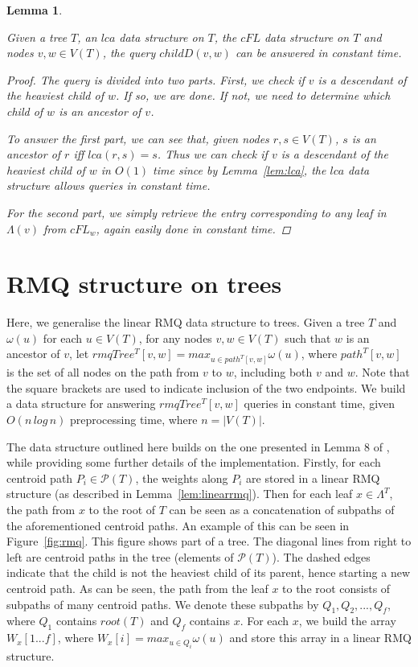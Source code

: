 \documentclass{article}
\newcommand{\leafset}{\Lambda}
\newcommand{\weight}{\omega}
\newtheorem{cfdquery}[incompatibility]{Lemma}
\begin{document}
    \medskip
    \begin{cfdquery}
        \label{lem:cfdquery}

        Given a tree $T$, an $lca$ data structure on $T$, the $cFL$ data structure on $T$ and nodes $v, w \in V(T)$, the query $childD(v, w)$ can be answered in constant time.

        \begin{proof}
            The query is divided into two parts. First, we check if $v$ is a descendant of the heaviest child of $w$. If so, we are done. If not, we need to determine which child of $w$ is an ancestor of $v$.

            To answer the first part, we can see that, given nodes $r, s \in V(T)$, $s$ is an ancestor of $r$ iff $lca(r, s) = s$. Thus we can check if $v$ is a descendant of the heaviest child of $w$ in $O(1)$ time since by Lemma~\ref{lem:lca}, the $lca$ data structure allows queries in constant time.

            For the second part, we simply retrieve the entry corresponding to any leaf in $\leafset(v)$ from $cFL_w$, again easily done in constant time.
        \end{proof}
    \end{cfdquery}

    \section{RMQ structure on trees}
    \label{sec:rmqtree}

    Here, we generalise the linear RMQ data structure to trees. Given a tree $T$ and $\weight(u)$ for each $u \in V(T)$, for any nodes $v, w \in V(T)$ such that $w$ is an ancestor of $v$, let $rmqTree^T[v, w] = max_{u \in path^T[v, w]}\weight(u)$, where $path^T[v, w]$ is the set of all nodes on the path from $v$ to $w$, including both $v$ and $w$. Note that the square brackets are used to indicate inclusion of the two endpoints. We build a data structure for answering $rmqTree^T[v, w]$ queries in constant time, given $O(n\,log\,n)$ preprocessing time, where $n = |V(T)|$.

    The data structure outlined here builds on the one presented in Lemma 8 of \cite{jansson2018algorithms}, while providing some further details of the implementation. Firstly, for each centroid path $P_i \in \mathcal{P}(T)$, the weights along $P_i$ are stored in a linear RMQ structure (as described in Lemma~\ref{lem:linearrmq}). Then for each leaf $x \in \leafset^T$, the path from $x$ to the root of $T$ can be seen as a concatenation of subpaths of the aforementioned centroid paths. An example of this can be seen in Figure~\ref{fig:rmq}. This figure shows part of a tree. The diagonal lines from right to left are centroid paths in the tree (elements of $\mathcal{P}(T)$). The dashed edges indicate that the child is not the heaviest child of its parent, hence starting a new centroid path. As can be seen, the path from the leaf $x$ to the root consists of subpaths of many centroid paths. We denote these subpaths by $Q_1, Q_2, ..., Q_f$, where $Q_1$ contains $root(T)$ and $Q_f$ contains $x$. For each $x$, we build the array $W_x[1 ... f]$, where $W_x[i] = max_{u \in Q_i}\weight(u)$ and store this array in a linear RMQ structure.
\end{document}
